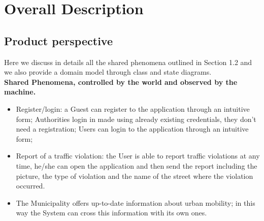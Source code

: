 \section{Overall Description}

\subsection{Product
perspective}
Here we discuss in details all the shared phenomena outlined in Section 1.2 and we also provide a domain model through class and state diagrams.
\\\newline
    \noindent\textbf{Shared Phenomena, controlled by the world and observed by the machine. }
\begin{itemize}
    \item Register/login: a Guest can register to the application through an intuitive form; Authorities login in made using already existing credentials, they don't need a registration;
    Users can login to the application through an intuitive form;
    \item Report of a traffic violation: the User is able to report traffic violations at any time, he/she can open the application and then send the report including the picture, the type of violation and the name of the street where the violation occurred.
    \item The Municipality offers up-to-date information about urban mobility; in this way the System can cross this information with its own ones. 
\end{itemize}

\vspace{10px}

